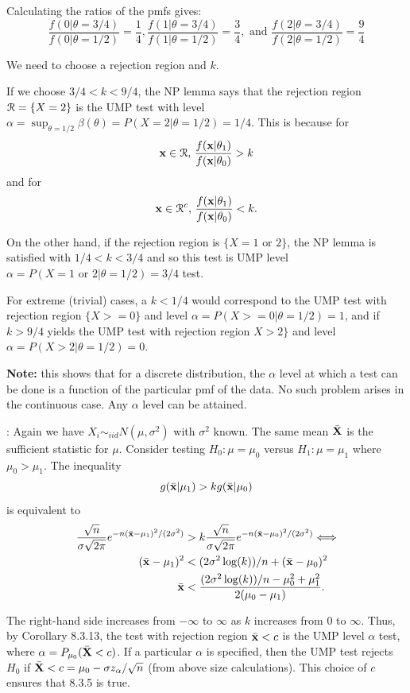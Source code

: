 \documentclass[11pt,]{article}
\def\bx{{\bf x}}
\def\bX{{\bf X}}
\def\bxbar{\bar{ \bx}}
\def\bXbar{\bar{ \bX}}
\def\Rsc{{\cal R}}
\def\bxbar{\bar{\bx}}
\begin{document}
Calculating the ratios of the pmfs gives:
\[\frac{f(0|\theta = 3/4)}{f(0|\theta = 1/2)} = \frac{1}{4},
\frac{f(1|\theta = 3/4)}{f(1|\theta = 1/2)} = \frac{3}{4}, \mbox{ and } \frac{f(2|\theta = 3/4)}{f(2|\theta = 1/2)} = \frac{9}{4}\]

We need to choose a rejection region and \(k\).

If we choose \(3/4 < k < 9/4\), the NP lemma says that the rejection
region \(\Rsc = \{X = 2\}\) is the UMP test with level
\(\alpha = \sup_{\theta = 1/2} \beta(\theta)= P(X=2 | \theta = 1/2) = 1/4\).
This is because for
\[\bx \in \Rsc , \, \frac{f(\bx | \theta_1)}{f(\bx | \theta_0)} > k\]
and for
\[ \bx \in \Rsc^c , \, \frac{f(\bx | \theta_1)}{f(\bx | \theta_0)} < k.\]

On the other hand, if the rejection region is
\(\{X =1 \mbox{ or } 2\}\), the NP lemma is satisfied with
\(1/4 < k < 3/4\) and so this test is UMP level
\(\alpha = P(X = 1 \mbox{ or } 2 | \theta = 1/2) = 3/4\) test.

For extreme (trivial) cases, a \(k < 1/4\) would correspond to the UMP
test with rejection region \(\{ X >= 0\}\) and level
\(\alpha = P(X >= 0 | \theta = 1/2) = 1\), and if \(k > 9/4\) yields the
UMP test with rejection region \(X > 2\}\) and level
\(\alpha = P(X > 2 | \theta = 1/2) = 0\).

\textbf{Note:} this shows that for a discrete distribution, the
\(\alpha\) level at which a test can be done is a function of the
particular pmf of the data. No such problem arises in the continuous
case. Any \(\alpha\) level can be attained.

: Again we have
\(X_i \sim_{iid} N(\mu,\sigma^2)\) with \(\sigma^2\) known. The same
mean \(\bXbar\) is the sufficient statistic for \(\mu\). Consider
testing \(H_0: \mu = \mu_0\) versus \(H_1: \mu = \mu_1\) where
\(\mu_0 > \mu_1\). The inequality
\[g(\bxbar | \mu_1) > k g(\bxbar | \mu_0)\] is equivalent to
\begin{align*}
\frac{\sqrt{n}}{\sigma\sqrt{2\pi}}e^{-n(\bxbar - \mu_1)^2/(2\sigma^2)} &> k \frac{\sqrt{n}}{\sigma\sqrt{2\pi}}e^{-n(\bxbar - \mu_0)^2/(2\sigma^2)} \Longleftrightarrow\\
(\bxbar - \mu_1)^2 & <(2\sigma^2 \log(k))/n + (\bxbar - \mu_0)^2\\
\bxbar &< \frac{(2\sigma^2 \log(k))/n - \mu_0^2 + \mu_1^2}{2(\mu_0 - \mu_1)}.
\end{align*}

The right-hand side increases from \(-\infty\) to \(\infty\) as \(k\)
increases from \(0\) to \(\infty\). Thus, by Corollary 8.3.13, the test
with rejection region \(\bxbar < c\) is the UMP level \(\alpha\) test,
where \(\alpha = P_{\mu_0}(\bXbar < c)\). If a particular \(\alpha\) is
specified, then the UMP test rejects \(H_0\) if
\(\bXbar < c = \mu_0 -\sigma z_\alpha /\sqrt{n}\) (from above size
calculations). This choice of \(c\) ensures that 8.3.5 is true.
\end{document}
